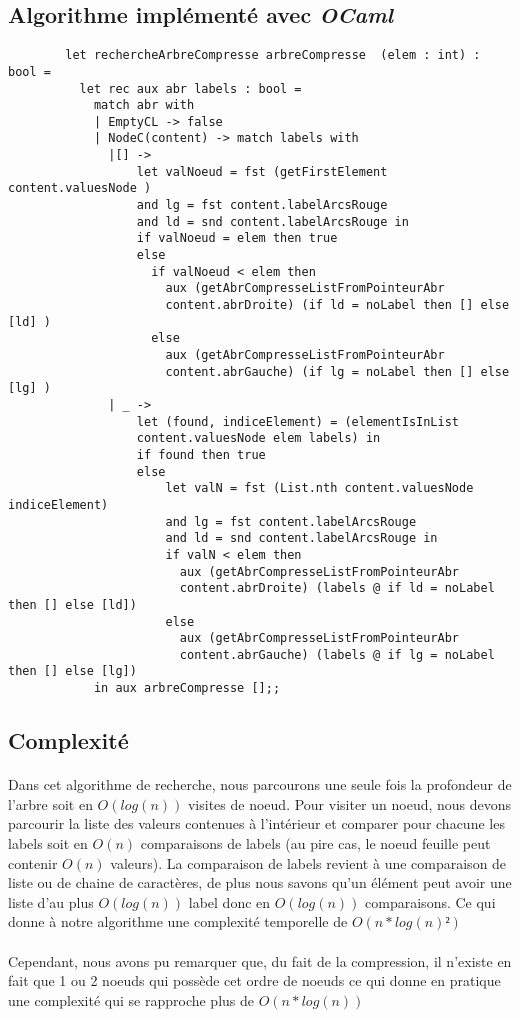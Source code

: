 \subsection{Algorithme implémenté avec \textit{OCaml}}
    \begin{verbatim} 
        let rechercheArbreCompresse arbreCompresse  (elem : int) : bool = 
          let rec aux abr labels : bool = 
            match abr with
            | EmptyCL -> false
            | NodeC(content) -> match labels with 
              |[] -> 
                  let valNoeud = fst (getFirstElement content.valuesNode )
                  and lg = fst content.labelArcsRouge
                  and ld = snd content.labelArcsRouge in 
                  if valNoeud = elem then true
                  else 
                    if valNoeud < elem then
                      aux (getAbrCompresseListFromPointeurAbr 
                      content.abrDroite) (if ld = noLabel then [] else [ld] )
                    else
                      aux (getAbrCompresseListFromPointeurAbr
                      content.abrGauche) (if lg = noLabel then [] else [lg] )
              | _ ->
                  let (found, indiceElement) = (elementIsInList 
                  content.valuesNode elem labels) in
                  if found then true 
                  else 
                      let valN = fst (List.nth content.valuesNode indiceElement) 
                      and lg = fst content.labelArcsRouge
                      and ld = snd content.labelArcsRouge in
                      if valN < elem then
                        aux (getAbrCompresseListFromPointeurAbr 
                        content.abrDroite) (labels @ if ld = noLabel then [] else [ld])
                      else
                        aux (getAbrCompresseListFromPointeurAbr 
                        content.abrGauche) (labels @ if lg = noLabel then [] else [lg])
            in aux arbreCompresse [];;
    \end{verbatim}
\subsection{Complexité}
\paragraph{}
Dans cet algorithme de recherche, nous parcourons une seule fois la profondeur de l'arbre soit en $O(log(n))$ visites de noeud. Pour visiter un noeud, nous devons parcourir la liste des valeurs contenues à l'intérieur et comparer pour chacune les labels soit en $O(n)$ comparaisons de labels (au pire cas, le noeud feuille peut contenir $O(n)$ valeurs). La comparaison de labels revient à une comparaison de liste ou de chaine de caractères, de plus nous savons qu'un élément peut avoir une liste d'au plus $O(log(n))$ label donc en $O(log(n))$ comparaisons.
Ce qui donne à notre algorithme une complexité temporelle de $O(n * log(n)²)$ \\ \\
Cependant, nous avons pu remarquer que, du fait de la compression, il n'existe en fait que 1 ou 2 noeuds qui possède cet ordre de noeuds ce qui donne en pratique une complexité qui se rapproche plus de $O(n * log(n))$


